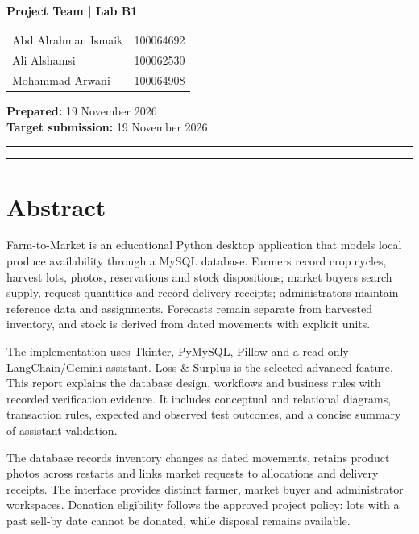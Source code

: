 \documentclass[12pt,a4paper]{report}
\begin{document}
\begin{titlepage}
\begin{center}
{\bfseries\color{kuBlue}Project Team  |  Lab B1}\\[8pt]
\begin{tabular}{@{}ll@{}}\toprule
Abd Alrahman Ismaik & 100064692\\Ali Alshamsi & 100062530\\Mohammad Arwani & 100064908\\\bottomrule\end{tabular}
\end{center}
\vfill
\begin{center}\textbf{Prepared:} 19 November 2026\\\textbf{Target submission:} 19 November 2026\end{center}
\vspace{0.4cm}
{\color{kuGold}\rule{\linewidth}{1.5pt}}\vspace{4pt}
{\color{kuBlue}\rule{\linewidth}{4pt}}
\end{titlepage}
\hypersetup{pageanchor=true}
\chapter*{Abstract}
Farm-to-Market is an educational Python desktop application that models local produce availability through a MySQL database. Farmers record crop cycles, harvest lots, photos, reservations and stock dispositions; market buyers search supply, request quantities and record delivery receipts; administrators maintain reference data and assignments. Forecasts remain separate from harvested inventory, and stock is derived from dated movements with explicit units.

The implementation uses Tkinter, PyMySQL, Pillow and a read-only LangChain/Gemini assistant. Loss \& Surplus is the selected advanced feature. This report explains the database design, workflows and business rules with recorded verification evidence. It includes conceptual and relational diagrams, transaction rules, expected and observed test outcomes, and a concise summary of assistant validation.

The database records inventory changes as dated movements, retains product photos across restarts and links market requests to allocations and delivery receipts. The interface provides distinct farmer, market buyer and administrator workspaces. Donation eligibility follows the approved project policy: lots with a past sell-by date cannot be donated, while disposal remains available.
\end{document}
